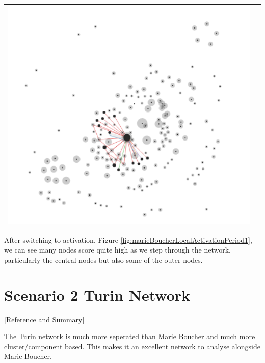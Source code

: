 \begin{center}
\begin{tabular}{cc}
\includegraphics[trim={0 0 0 0}, width=140mm]{./Figures/marieBoucherLocalActivationPeriod1.png}
\end{tabular}
\label{fig:marieBoucherLocalActivationPeriod1}
\end{center} 
After switching to activation, Figure \ref{fig:marieBoucherLocalActivationPeriod1}, we can see many nodes score quite high as we step through the network, particularly the central nodes but also some of the outer nodes.

\section{Scenario 2 Turin Network}

[Reference and Summary]

The Turin network is much more seperated than Marie Boucher and much more cluster/component based. This makes it an excellent network to analyse alongside Marie Boucher.

